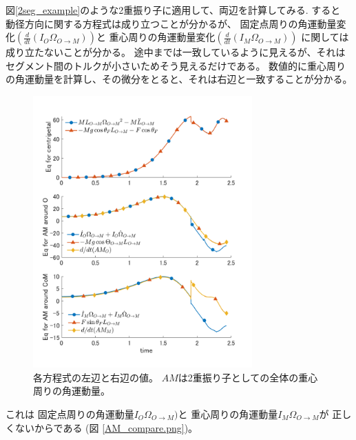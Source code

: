 \documentclass[a4paper,11pt]{jsarticle}
\begin{document}
図\ref{2seg_example}のような2重振り子に適用して、両辺を計算してみる.
すると
動径方向に関する方程式は成り立つことが分かるが、
固定点周りの角運動量変化$\left(\frac{d}{dt}\left(I_O\Omega_{O\rightarrow M}\right)\right)$と
重心周りの角運動量変化$\left(\frac{d}{dt}\left(I_M\Omega_{O\rightarrow M}\right)\right)$
に関しては成り立たないことが分かる。
途中までは一致しているように見えるが、それはセグメント間のトルクが小さいためそう見えるだけである。
数値的に重心周りの角運動量を計算し、その微分をとると、それは右辺と一致することが分かる。
\begin{figure}[h]
  \centering
  \includegraphics[width = 0.75\textwidth]{equation_values.png}
  \caption{
    各方程式の左辺と右辺の値。
    $AM$は2重振り子としての全体の重心周りの角運動量。
  }
  \label{equation_values.png}
\end{figure}

これは
固定点周りの角運動量$I_O\Omega_{O\rightarrow M})$と
重心周りの角運動量$I_M\Omega_{O\rightarrow M}$が
正しくないからである
(図 \ref{AM_compare.png})。
\end{document}
